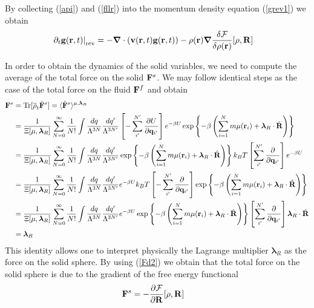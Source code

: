 \documentclass[b5paper,openright,11pt]{book}
\begin{document}
By  collecting (\ref{api})  and  (\ref{fllr})  into  the  momentum  density  equation (\ref{grev1}) we obtain
\begin{align}
\left.\partial_t {\bf g}({\bf r},t)\right|_{\rm rev} 
&=-\boldsymbol{\nabla}\cdot\left({\bf v}({\bf r},t)  {\bf g}({\bf r},t)  \right)
-\rho({\bf r})\boldsymbol{\nabla}
\frac{\delta {\cal F}}{\delta\rho({\bf r})}[\rho,{\bf R}]
\label{grev}
\end{align}

In order to obtain the dynamics of the solid variables, we need to compute the average of the total force on the solid ${\bf F}^s$. We may follow identical steps as the case of the total force on the fluid ${\bf F}^f$ and obtain
\begin{align}
{\bf F}^s&={\rm Tr}[\overline{\rho}_t \hat{\bf F}^s]=
 \langle \hat{\bf F}^s\rangle^{\mu,\boldsymbol{\lambda}_R} 
\nonumber\\
&=\frac{1}{\Xi[\mu,\boldsymbol{\lambda}_R]}
 \sum_{N=0}^\infty \frac{1}{N!}
\int \frac{dq}{\Lambda^{3N}}\frac{dq'}{\Lambda^{3N'}}
\left[-\sum^{N'}_{i'}\frac{\partial U}{\partial {\bf q}_{i'}}\right]
e^{-\beta U}
\exp\left\{-\beta  \left(\sum_{i=1}^N m\mu({\bf
    r}_i)+ \boldsymbol{\lambda}_R\cdot\hat{\bf R}\right)\right\}
\nonumber\\
&=
\frac{1}{\Xi[\mu,\boldsymbol{\lambda}_R]}
 \sum_{N=0}^\infty \frac{1}{N!}
\int \frac{dq}{\Lambda^{3N}}\frac{dq'}{\Lambda^{3N'}}
\exp\left\{-\beta  \left(\sum_{i=1}^N m\mu({\bf
    r}_i)+ \boldsymbol{\lambda}_R\cdot\hat{\bf R}\right)\right\}
k_BT\left[\sum^{N'}_{i'}\frac{\partial }{\partial {\bf q}_{i'}}\right]e^{-\beta U}
\nonumber\\
&=
\frac{1}{\Xi[\mu,\boldsymbol{\lambda}_R]}
 \sum_{N=0}^\infty \frac{1}{N!}
\int \frac{dq}{\Lambda^{3N}}\frac{dq'}{\Lambda^{3N'}}
e^{-\beta U}
k_BT\left[-\sum^{N'}_{i'}\frac{\partial }{\partial {\bf q}_{i'}}\right]\exp\left\{-\beta  \left(\sum_{i=1}^N m\mu({\bf
    r}_i)+ \boldsymbol{\lambda}_R\cdot\hat{\bf R}\right)\right\}
\nonumber\\
&=
\frac{1}{\Xi[\mu,\boldsymbol{\lambda}_R]}
 \sum_{N=0}^\infty \frac{1}{N!}
\int \frac{dq}{\Lambda^{3N}}\frac{dq'}{\Lambda^{3N'}}
e^{-\beta U}
\exp\left\{-\beta  \left(\sum_{i=1}^N m\mu({\bf
    r}_i)+ \boldsymbol{\lambda}_R\cdot\hat{\bf R}\right)\right\}
\left[\sum^{N'}_{i'}\frac{\partial }{\partial {\bf q}_{i'}}\right] \boldsymbol{\lambda}_R\cdot\hat{\bf R}
\nonumber\\
&=\boldsymbol{\lambda}_R
\label{lf}\end{align}
This  identity  allows  one  to  interpret  physically  the  Lagrange
multiplier $\boldsymbol{\lambda}_R$ as the  force on the solid sphere.
By  using (\ref{Fd2})  we obtain  that the  total force  on the  solid
sphere is due to the gradient of the free energy functional
\begin{align}
{\bf F}^s&=-\frac{\partial  {\cal F}}{\partial{\bf R}}[\rho,{\bf R}]
\label{Fls}
\end{align}
\end{document}
